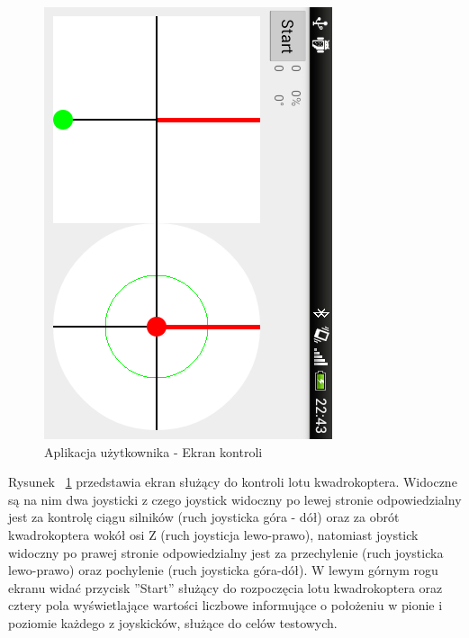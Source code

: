 \begin{figure}[H]
	\centering
	\includegraphics[scale=0.8, angle=90]{Pictures/DroidAtScreen/droid@screen-4.png}
	\caption[Aplikacja użytkownika - Ekran kontroli]{Aplikacja użytkownika - Ekran kontroli}
	\label{fig:QuadroControl_screen4}
\end{figure}

Rysunek ~\ref{fig:QuadroControl_screen4} przedstawia ekran służący do kontroli lotu kwadrokoptera. Widoczne są na nim dwa joysticki z czego joystick widoczny po lewej stronie odpowiedzialny jest za kontrolę ciągu silników (ruch joysticka góra - dół) oraz za obrót kwadrokoptera wokół osi Z (ruch joysticja lewo-prawo), natomiast joystick widoczny po prawej stronie odpowiedzialny jest za przechylenie (ruch joysticka lewo-prawo) oraz pochylenie (ruch joysticka góra-dół). W lewym górnym rogu ekranu widać przycisk ''Start'' służący do rozpoczęcia lotu kwadrokoptera oraz cztery pola wyświetlające wartości liczbowe informujące o położeniu w pionie i poziomie każdego z joyskicków, służące do celów testowych.

